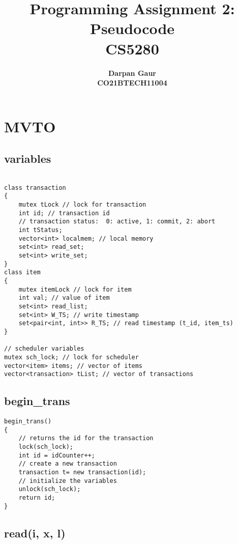 \documentclass[12pt]{article}
\title{
    \textbf{Programming Assignment 2: Pseudocode} \\ 
    \textbf{CS5280} \\
}
\author{
    \textbf{Darpan Gaur} \\
    \textbf{CO21BTECH11004}
}
\date{}
\begin{document}
\maketitle

\hrulefill

\section*{MVTO}

\subsection*{variables}
\begin{lstlisting}

class transaction
{
    mutex tLock // lock for transaction
    int id; // transaction id
    // transaction status:  0: active, 1: commit, 2: abort
    int tStatus; 
    vector<int> localmem; // local memory
    set<int> read_set;
    set<int> write_set;
}
class item
{
    mutex itemLock // lock for item
    int val; // value of item
    set<int> read_list;
    set<int> W_TS; // write timestamp
    set<pair<int, int>> R_TS; // read timestamp (t_id, item_ts)
}

// scheduler variables
mutex sch_lock; // lock for scheduler
vector<item> items; // vector of items
vector<transaction> tList; // vector of transactions

\end{lstlisting}

\subsection*{begin\_trans}

\begin{lstlisting}
begin_trans()
{
    // returns the id for the transaction
    lock(sch_lock);
    int id = idCounter++;
    // create a new transaction
    transaction t= new transaction(id);
    // initialize the variables
    unlock(sch_lock);
    return id;
}
\end{lstlisting}

\subsection*{read(i, x, l)}
\end{document}
